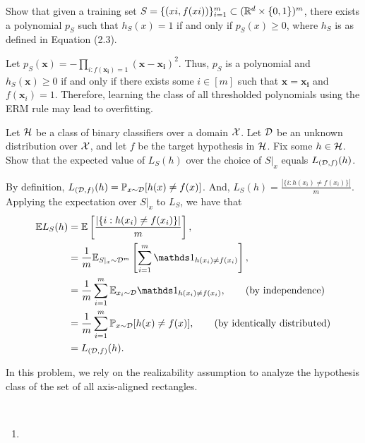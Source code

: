 \begin{problem}{1}
Show that given a training set $S=\{(xi,f(xi))\}_{i=1}^m \subset (\mathbb{R}^d \times \{0,1\})^m$, there exists a polynomial $p_S$ such that
$h_S(x)=1$ if and only if $p_S(x) \geq 0$, where $h_S$ is as defined in Equation (2.3).
\end{problem}
\begin{solution}
    Let $p_S(\bm{x}) = -\prod_{i: f(\bm{x_i}) = 1} (\bm{x} - \bm{x_i})^2$. Thus, $p_S$ is a polynomial and $h_S(\bm{x}) \geq 0$ if and only if there exists some $i \in [m]$ such that $\bm{x} = \bm{x_i}$ and $f(\bm{x}_i) = 1$. Therefore, learning the class of all thresholded polynomials using the ERM rule may lead to overfitting.
\end{solution}


\begin{problem}{2}
Let $\mathcal{H}$ be a class of binary classifiers over a domain $\mathcal{X}$. Let $\mathcal{D}$ be an unknown distribution over $\mathcal{X}$, and let $f$ be the target hypothesis in $\mathcal{H}$. Fix some $h\in\mathcal{H}$. Show that the expected value of $L_S(h)$ over the choice of $S|_x$ equals $L_{(\mathcal{D},f)}(h)$.
\end{problem}
\begin{solution}
    By definition, $L_{(\mathcal{D}, f)}(h) = \mathbb{P}_{x \sim \mathcal{D}}[h(x) \neq f(x)]$. And, $L_S(h) = \frac{|\{i : h(x_i) \neq f(x_i)\}|}{m}$. Applying the expectation over $S|_x$ to $L_S$, we have that 
    \begin{align*}
        \E L_S(h) &= \E\left[\frac{|\{i : h(x_i) \neq f(x_i)\}|}{m}\right] , \\
        &= \frac{1}{m} \E_{S|_x \sim \cD^m}\left[ \sum_{i=1}^m \ind_{h(x_i) \neq f(x_i)}\right], \\
        &= \frac{1}{m} \sum_{i=1}^m \E_{x_i \sim \cD} \ind_{h(x_i) \neq f(x_i)}, \tag{by independence} \\
        &= \frac{1}{m}\sum_{i=1}^m \P_{x \sim \cD}[h(x) \neq f(x)], \tag{by identically distributed} \\
        &= L_{(\cD, f)}(h).
    \end{align*}
\end{solution}

\begin{problem}{3}
    In this problem, we rely on the realizability assumption to analyze the hypothesis class of the set of all axis-aligned rectangles.
\end{problem}
\begin{solution} \
    \begin{enumerate}[label=(\alph*)]
        \item
    \end{enumerate}
\end{solution}